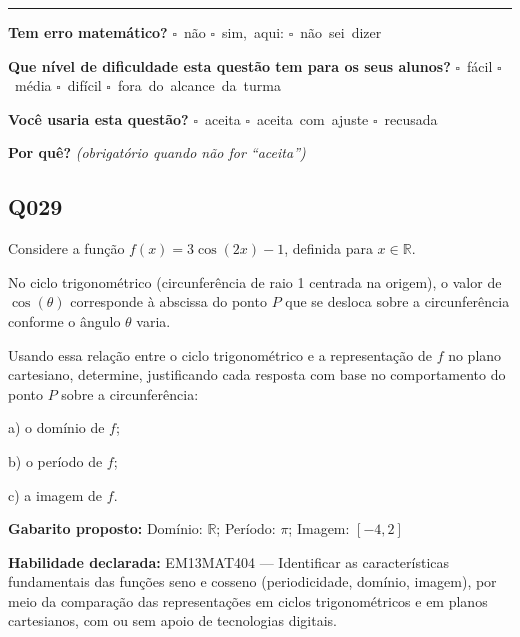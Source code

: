 \documentclass[11pt,a4paper]{article}
\begin{document}
\noindent\rule{\linewidth}{0.4pt}
\textbf{Tem erro matemático?}\quad
\mbox{$\square$~não} \quad \mbox{$\square$~sim, aqui:} \underline{\hspace{5cm}}
\quad \mbox{$\square$~não sei dizer}

\textbf{Que nível de dificuldade esta questão tem para os seus alunos?}\quad
\mbox{$\square$~fácil} \quad \mbox{$\square$~média} \quad
\mbox{$\square$~difícil} \quad \mbox{$\square$~fora do alcance da turma}

\textbf{Você usaria esta questão?}\quad
\mbox{$\square$~aceita} \quad \mbox{$\square$~aceita com ajuste} \quad
\mbox{$\square$~recusada}

\textbf{Por quê?} \emph{(obrigatório quando não for ``aceita'')}

\underline{\hspace{\linewidth}}

\underline{\hspace{\linewidth}}
\vspace{0.6em}

\begin{samepage}
\subsection*{Q029}
Considere a função $f(x) = 3\cos(2x) - 1$, definida para $x \in \mathbb{R}$.

No ciclo trigonométrico (circunferência de raio 1 centrada na origem), o valor de $\cos(\theta)$ corresponde à abscissa do ponto $P$ que se desloca sobre a circunferência conforme o ângulo $\theta$ varia.

Usando essa relação entre o ciclo trigonométrico e a representação de $f$ no plano cartesiano, determine, justificando cada resposta com base no comportamento do ponto $P$ sobre a circunferência:

a) o domínio de $f$;

b) o período de $f$;

c) a imagem de $f$.

\textbf{Gabarito proposto:} Domínio: $\mathbb{R}$; Período: $\pi$; Imagem: $[-4, 2]$

\textbf{Habilidade declarada:} EM13MAT404 --- Identificar as características fundamentais das funções seno e cosseno (periodicidade, domínio, imagem), por meio da comparação das representações em ciclos trigonométricos e em planos cartesianos, com ou sem apoio de tecnologias digitais.
\end{samepage}
\end{document}
